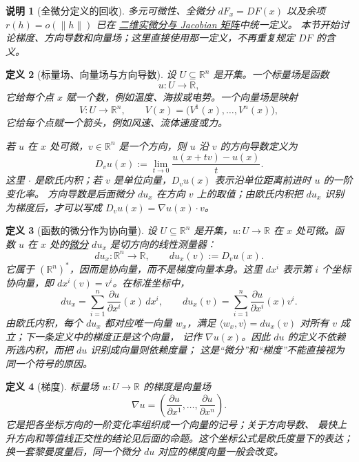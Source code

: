 \documentclass[UTF8,fontset=none,a4paper,11pt]{ctexart}
\theoremstyle{foundation-definition}
\newtheorem{definition}{定义}[section]
\theoremstyle{foundation-theorem}
\theoremstyle{foundation-proposition}
\theoremstyle{foundation-example}
\theoremstyle{foundation-remark}
\newtheorem{remark}[definition]{说明}
\theoremstyle{foundation-theorem}
\newcommand{\term}[2]{\hyperref[#1]{#2}}
\begin{document}
\begin{remark}[全微分定义的回收]
多元可微性、全微分 \(dF_x=DF(x)\) 以及余项
\(r(h)=o(\lVert h\rVert)\) 已在
\term{def:total-differential}{二维实微分与 Jacobian 矩阵}中统一定义。
本节开始讨论梯度、方向导数和向量场；这里直接使用那一定义，不再重复规定
\(DF\) 的含义。
\end{remark}

\begin{definition}[标量场、向量场与方向导数]\label{def:vector-calculus-triad}
设 \(U\subseteq\mathbb R^n\) 是开集。一个标量场是函数
\[
u:U\longrightarrow\mathbb R,
\]
它给每个点 \(x\) 赋一个数，例如温度、海拔或电势。一个向量场是映射
\[
V:U\longrightarrow\mathbb R^n,\qquad
V(x)=\bigl(V^1(x),\ldots,V^n(x)\bigr),
\]
它给每个点赋一个箭头，例如风速、流体速度或力。

若 \(u\) 在 \(x\) 处可微，\(v\in\mathbb R^n\) 是一个方向，则 \(u\) 沿 \(v\) 的方向导数定义为
\[
D_vu(x):=\lim_{t\to0}\frac{u(x+tv)-u(x)}{t}.
\]
这里 \(\cdot\) 是欧氏内积；若 \(v\) 是单位向量，\(D_vu(x)\) 表示沿单位距离前进时 \(u\) 的一阶变化率。
方向导数是后面微分 \(du_x\) 在方向 \(v\) 上的取值；由欧氏内积把
\(du_x\) 识别为梯度后，才可以写成
\(D_vu(x)=\nabla u(x)\cdot v\)。
\end{definition}

\begin{definition}[函数的微分作为协向量]\label{def:differential-one-form}
设 \(U\subseteq\mathbb R^n\) 是开集，\(u:U\to\mathbb R\) 在 \(x\) 处可微。函数
\(u\) 在 \(x\) 处的\term{def:differential-one-form}{微分} \(du_x\) 是切方向的线性测量器：
\[
du_x:\mathbb R^n\longrightarrow\mathbb R,\qquad
du_x(v):=D_vu(x).
\]
它属于 \((\mathbb R^n)^*\)，因而是协向量，而不是梯度向量本身。这里
\(dx^i\) 表示第 \(i\) 个坐标协向量，即 \(dx^i(v)=v^i\)。在标准坐标中，
\[
du_x=\sum_{i=1}^n\frac{\partial u}{\partial x^i}(x)\,dx^i,
\qquad
du_x(v)=\sum_{i=1}^n\frac{\partial u}{\partial x^i}(x)v^i.
\]
由欧氏内积，每个 \(du_x\) 都对应唯一向量 \(w_x\)，满足
\(\langle w_x,v\rangle=du_x(v)\) 对所有 \(v\) 成立；下一条定义中的梯度正是这个向量，
记作 \(\nabla u(x)\)。因此 \(du\) 的定义不依赖所选内积，而把 \(du\) 识别成向量则依赖度量；
这是“微分”和“梯度”不能直接视为同一个符号的原因。
\end{definition}

\begin{definition}[梯度]\label{def:gradient}
标量场 \(u:U\to\mathbb R\) 的梯度是向量场
\[
\nabla u
=\left(\frac{\partial u}{\partial x^1},\ldots,
\frac{\partial u}{\partial x^n}\right).
\]
它是把各坐标方向的一阶变化率组织成一个向量的记号；关于方向导数、
最快上升方向和等值线正交性的结论见后面的命题。这个坐标公式是欧氏度量下的表达；
换一套黎曼度量后，同一个微分 \(du\) 对应的梯度向量一般会改变。
\end{definition}
\end{document}
